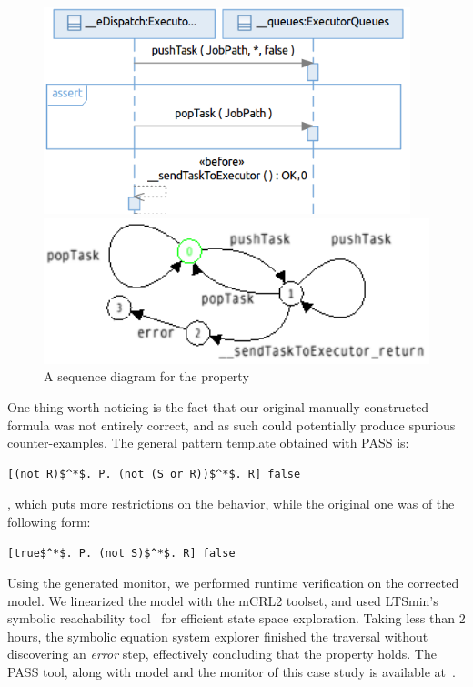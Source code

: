 \documentclass[letter]{llncs}
\begin{document}
\begin{figure}[!b]
 \centering
\begin{minipage}[!t]{0.5\linewidth}
\includegraphics[width=0.95\textwidth]{./SDProperty.png}%
\caption{A sequence diagram for the property}
\label{fig:SDProperty}
\end{minipage}%
\begin{minipage}[t]{0.5\linewidth}
\includegraphics[width=1.0\textwidth]{./PropertyAutomaton.png}%
%
\end{minipage}
\end{figure}
One thing worth noticing is the fact that our original manually constructed formula was not entirely correct, and as such could potentially produce spurious counter-examples. 
The general pattern template obtained with PASS is:
\begin{lstlisting}[basicstyle=\sffamily\fontsize{7}{7}\selectfont,showspaces=false,showstringspaces=false,showtabs=false,mathescape]
[(not R)$^*$. P. (not (S or R))$^*$. R] false
\end{lstlisting} 
, which puts more restrictions on the behavior, while the original one was of the following form:
\begin{lstlisting}[basicstyle=\sffamily\fontsize{7}{7}\selectfont,showspaces=false,showstringspaces=false,showtabs=false,mathescape]
[true$^*$. P. (not S)$^*$. R] false
\end{lstlisting} 
Using the generated monitor, we performed runtime verification on the corrected model. We linearized the model with the mCRL2 toolset,
and used LTSmin's symbolic reachability tool~\cite{so62465} for efficient state space exploration. Taking less than 2 hours, the symbolic equation system explorer 
finished the traversal without discovering an \emph{error} step, effectively concluding that the property holds.
The PASS tool, along with model and the monitor of this case study is available at~\cite{repo:PASS}.
\vspace{-16 pt}
\end{document}
